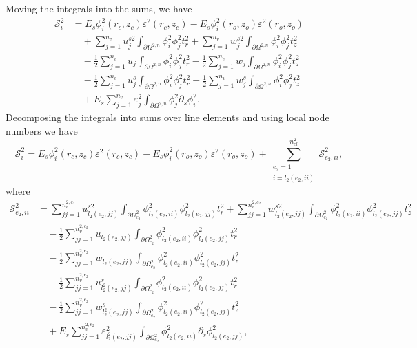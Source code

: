 \documentclass{article}
\begin{document}
Moving the integrals into the sums, we have
\begin{align}
\mathcal{S}_i^2 &= E_s \phi_i^2(r_c,z_c) \varepsilon^2(r_c,z_c) - E_s \phi_i^2(r_o,z_o) \varepsilon^2(r_o,z_o) \nonumber\\
&\quad + \sum_{j=1}^{n_v} u_j^{s2} \int_{\partial \Omega^{2,n}} \phi_i^2 \phi_j^2 t_r^2 + \sum_{j=1}^{n_v} w_j^{s2} \int_{\partial \Omega^{2,n}} \phi_i^2 \phi_j^2 t_z^2 \nonumber\\
&\quad - \frac{1}{2} \sum_{j=1}^{n_v} u_j \int_{\partial \Omega^{2,n}} \phi_i^2 \phi_j^2 t_r^2 - \frac{1}{2} \sum_{j=1}^{n_v} w_j \int_{\partial \Omega^{2,n}} \phi_i^2 \phi_j^2 t_z^2 \nonumber\\
&\quad - \frac{1}{2} \sum_{j=1}^{n_v} u_j^s \int_{\partial \Omega^{2,n}} \phi_i^2 \phi_j^2 t_r^2 - \frac{1}{2} \sum_{j=1}^{n_v} w_j^s \int_{\partial \Omega^{2,n}} \phi_i^2 \phi_j^2 t_z^2 \nonumber\\
&\quad + E_s \sum_{j=1}^{n_v} \varepsilon_j^2 \int_{\partial \Omega^{2,n}} \phi_j^2 \partial_s \phi_i^2. \tag{7.17}
\end{align}
Decomposing the integrals into sums over line elements and using local node numbers we have
\begin{equation}
\mathcal{S}_i^2 = E_s \phi_i^2(r_c,z_c) \varepsilon^2(r_c,z_c) - E_s \phi_i^2(r_o,z_o) \varepsilon^2(r_o,z_o) + \sum_{\substack{e_2=1\\ i=l_2(e_2,ii)}}^{n_{el}^2} \mathcal{S}_{e_2,ii}^2, \tag{7.18}
\end{equation}
where
\begin{align}
\mathcal{S}_{e_2,ii}^2 &= \sum_{jj=1}^{n_v^{2,e_2}} u_{l_2(e_2,jj)}^{s2} \int_{\partial \Omega_{e_2}^2} \phi_{l_2(e_2,ii)}^2 \phi_{l_2(e_2,jj)}^2 t_r^2 + \sum_{jj=1}^{n_v^{2,e_2}} w_{l_2(e_2,jj)}^{s2} \int_{\partial \Omega_{e_2}^2} \phi_{l_2(e_2,ii)}^2 \phi_{l_2(e_2,jj)}^2 t_z^2 \nonumber\\
&\quad - \frac{1}{2} \sum_{jj=1}^{n_v^{2,e_2}} u_{l_2(e_2,jj)} \int_{\partial \Omega_{e_2}^2} \phi_{l_2(e_2,ii)}^2 \phi_{l_2(e_2,jj)}^2 t_r^2 \nonumber\\
&\quad - \frac{1}{2} \sum_{jj=1}^{n_v^{2,e_2}} w_{l_2(e_2,jj)} \int_{\partial \Omega_{e_2}^2} \phi_{l_2(e_2,ii)}^2 \phi_{l_2(e_2,jj)}^2 t_z^2 \nonumber\\
&\quad - \frac{1}{2} \sum_{jj=1}^{n_v^{2,e_2}} u_{l_2^2(e_2,jj)}^s \int_{\partial \Omega_{e_2}^2} \phi_{l_2(e_2,ii)}^2 \phi_{l_2(e_2,jj)}^2 t_r^2 \nonumber\\
&\quad - \frac{1}{2} \sum_{jj=1}^{n_v^{2,e_2}} w_{l_2^2(e_2,jj)}^s \int_{\partial \Omega_{e_2}^2} \phi_{l_2(e_2,ii)}^2 \phi_{l_2(e_2,jj)}^2 t_z^2 \nonumber\\
&\quad + E_s \sum_{jj=1}^{n_v^{2,e_2}} \varepsilon_{l_2^2(e_2,jj)}^2 \int_{\partial \Omega_{e_2}^2} \phi_{l_2(e_2,ii)}^2 \partial_s \phi_{l_2(e_2,jj)}^2, \tag{7.19}
\end{align}
\end{document}
